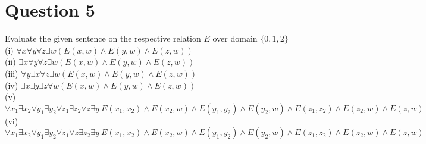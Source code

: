 \documentclass[12pt]{fphw}
\begin{document}
\section*{Question 5}

\begin{problem}
  Evaluate the given sentence on the respective relation $E$ over domain $\{0,1,2\}$ \\
  (i) $\forall x \forall y \forall z \exists w (E(x,w) \wedge E(y,w) \wedge E(z,w))$ \\
  (ii) $\exists x \forall y \forall z \exists w (E(x,w) \wedge E(y,w) \wedge E(z,w))$ \\
  (iii) $\forall y \exists x \forall z \exists w (E(x,w) \wedge E(y,w) \wedge E(z,w))$ \\
  (iv) $\exists x \exists y \exists z \forall w (E(x,w) \wedge E(y,w) \wedge E(z,w))$ \\
  (v) $\forall x_1 \exists x_2 \forall y_1 \exists y_2 \forall z_1 \exists z_2 \forall z \exists y \ E(x_1, x_2) \wedge E(x_2, w) \wedge E(y_1, y_2) \wedge E(y_2, w) \wedge E(z_1, z_2) \wedge E(z_2, w) \wedge E(z,w)$ \\
  (vi) $\forall x_1 \exists x_2 \forall y_1 \exists y_2 \forall z_1 \forall z \exists z_2 \exists y \ E(x_1, x_2) \wedge E(x_2, w) \wedge E(y_1, y_2) \wedge E(y_2, w) \wedge E(z_1, z_2) \wedge E(z_2, w) \wedge E(z,w)$
\end{problem}
\end{document}
